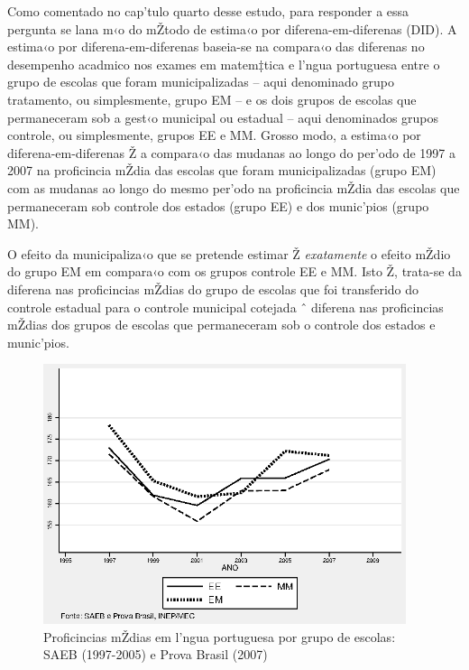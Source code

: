 \documentclass[a4paper, 12pt]{article}
\begin{document}
Como comentado no cap’tulo quarto desse estudo, para responder a essa pergunta se lana m‹o do mŽtodo de estima‹o por diferena-em-diferenas (DID). A estima‹o por diferena-em-diferenas baseia-se na compara‹o das diferenas no desempenho acadmico nos exames em matem‡tica e l’ngua portuguesa entre o grupo de escolas que foram municipalizadas -- aqui denominado grupo tratamento, ou simplesmente, grupo EM -- e os dois grupos de escolas que permaneceram sob a gest‹o municipal ou estadual -- aqui denominados grupos controle, ou simplesmente, grupos EE e MM. Grosso modo, a estima‹o por diferena-em-diferenas Ž a compara‹o das mudanas ao longo do per’odo de 1997 a 2007 na proficincia mŽdia das escolas que foram municipalizadas (grupo EM) com as mudanas ao longo do mesmo per’odo na proficincia mŽdia das escolas que permaneceram sob controle dos estados (grupo EE) e dos munic’pios (grupo MM).

O efeito da municipaliza‹o que se pretende estimar Ž \emph{exatamente} o efeito mŽdio do grupo EM em compara‹o com os grupos controle EE e MM. Isto Ž, trata-se da diferena nas proficincias mŽdias do grupo de escolas que foi transferido do controle estadual para o controle municipal cotejada ˆ diferena nas proficincias mŽdias dos grupos de escolas que permaneceram sob o controle dos estados e munic’pios.
 
 
 

\vspace*{1cm} 

\begin{figure}[h]
\centering
\begin{footnotesize}
\caption{Proficincias mŽdias em l’ngua portuguesa por grupo \newline de escolas: SAEB (1997-2005) e Prova Brasil (2007)} 
\label{fig:diff_port}                             
 \includegraphics[height=3in]{diff_port}
\end{footnotesize}
\end{figure}
 
\end{document}
